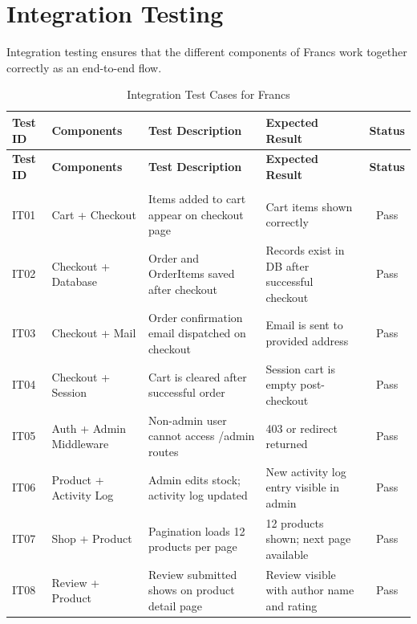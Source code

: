 \newpage
\section{Integration Testing}
Integration testing ensures that the different components of Francs work together correctly as an end-to-end flow.

\renewcommand{\arraystretch}{1.3}
\begin{longtable}{|p{1.5cm}|p{3cm}|p{3.5cm}|p{3.5cm}|c|}
    \hline
    \textbf{Test ID} & \textbf{Components} & \textbf{Test Description} & \textbf{Expected Result} & \textbf{Status} \\
    \hline
    \endfirsthead
    \hline
    \textbf{Test ID} & \textbf{Components} & \textbf{Test Description} & \textbf{Expected Result} & \textbf{Status} \\
    \hline
    \endhead
    \hline
    \endfoot
    \hline
    \caption{Integration Test Cases for Francs} \label{tab:integration_tests} \\
    \endlastfoot
    IT01 & Cart + Checkout & \raggedright Items added to cart appear on checkout page & \raggedright Cart items shown correctly & Pass \\
    \hline
    IT02 & Checkout + Database & \raggedright Order and OrderItems saved after checkout & \raggedright Records exist in DB after successful checkout & Pass \\
    \hline
    IT03 & Checkout + Mail & \raggedright Order confirmation email dispatched on checkout & \raggedright Email is sent to provided address & Pass \\
    \hline
    IT04 & Checkout + Session & \raggedright Cart is cleared after successful order & \raggedright Session cart is empty post-checkout & Pass \\
    \hline
    IT05 & Auth + Admin Middleware & \raggedright Non-admin user cannot access /admin routes & \raggedright 403 or redirect returned & Pass \\
    \hline
    IT06 & Product + Activity Log & \raggedright Admin edits stock; activity log updated & \raggedright New activity log entry visible in admin & Pass \\
    \hline
    IT07 & Shop + Product & \raggedright Pagination loads 12 products per page & \raggedright 12 products shown; next page available & Pass \\
    \hline
    IT08 & Review + Product & \raggedright Review submitted shows on product detail page & \raggedright Review visible with author name and rating & Pass \\
    \hline
\end{longtable}

